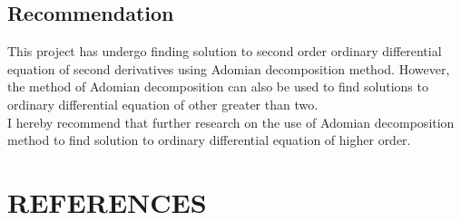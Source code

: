 \documentclass[11pt]{report}
\newcommand{\NI}{\noindent}
\begin{document}
	\section{Recommendation}
	This project has undergo finding solution to second order ordinary differential equation of second derivatives using Adomian decomposition method. However, the method of Adomian decomposition can also be used to find solutions to ordinary differential equation of other greater than two.\\
	
	\NI I hereby recommend that further research on the use of Adomian decomposition method to find solution to ordinary differential equation of higher order.

	
	\chapter*{REFERENCES}
	
\end{document}
